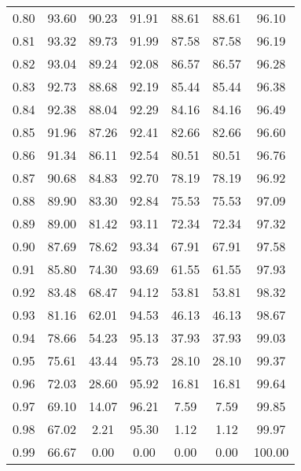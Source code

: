 \begin{tabular}{|c|c|c|c|c|c|c|}
      0.80 &     93.60 &     90.23 &      91.91 &   88.61 &      88.61 &         96.10 \\
      0.81 &     93.32 &     89.73 &      91.99 &   87.58 &      87.58 &         96.19 \\
      0.82 &     93.04 &     89.24 &      92.08 &   86.57 &      86.57 &         96.28 \\
      0.83 &     92.73 &     88.68 &      92.19 &   85.44 &      85.44 &         96.38 \\
      0.84 &     92.38 &     88.04 &      92.29 &   84.16 &      84.16 &         96.49 \\
      0.85 &     91.96 &     87.26 &      92.41 &   82.66 &      82.66 &         96.60 \\
      0.86 &     91.34 &     86.11 &      92.54 &   80.51 &      80.51 &         96.76 \\
      0.87 &     90.68 &     84.83 &      92.70 &   78.19 &      78.19 &         96.92 \\
      0.88 &     89.90 &     83.30 &      92.84 &   75.53 &      75.53 &         97.09 \\
      0.89 &     89.00 &     81.42 &      93.11 &   72.34 &      72.34 &         97.32 \\
      0.90 &     87.69 &     78.62 &      93.34 &   67.91 &      67.91 &         97.58 \\
      0.91 &     85.80 &     74.30 &      93.69 &   61.55 &      61.55 &         97.93 \\
      0.92 &     83.48 &     68.47 &      94.12 &   53.81 &      53.81 &         98.32 \\
      0.93 &     81.16 &     62.01 &      94.53 &   46.13 &      46.13 &         98.67 \\
      0.94 &     78.66 &     54.23 &      95.13 &   37.93 &      37.93 &         99.03 \\
      0.95 &     75.61 &     43.44 &      95.73 &   28.10 &      28.10 &         99.37 \\
      0.96 &     72.03 &     28.60 &      95.92 &   16.81 &      16.81 &         99.64 \\
      0.97 &     69.10 &     14.07 &      96.21 &    7.59 &       7.59 &         99.85 \\
      0.98 &     67.02 &      2.21 &      95.30 &    1.12 &       1.12 &         99.97 \\
      0.99 &     66.67 &      0.00 &       0.00 &    0.00 &       0.00 &        100.00 \\
\bottomrule
\end{tabular}
